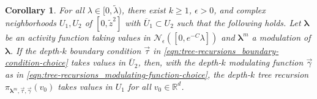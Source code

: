 \documentclass[11pt]{article}
\newcommand{\R}{\mathbb R}
\newcommand{\bl}{\bm{\lambda}}
\newcommand{\tl}{\tilde{\lambda}}
\newcommand{\tz}{\tilde{z}}
\newcommand{\lsconst}{C}
\numberwithin{equation}{section}
\theoremstyle{plain}
\newtheorem{corollary}[theorem]{Corollary}
\theoremstyle{definition}
\theoremstyle{remark}
\begin{document}
\begin{corollary}
\label{cor:contraction-properties_complex-contraction_final-result}
For all $\lambda\in[0,\tl)$, there exist $k\ge 1$, $\epsilon>0$, and complex neighborhoods $U_{1},U_{2}$ of $[0,\tz^{2}]$ with $\overline{U}_{1}\subset U_{2}$ such that the following holds.
Let $\bl$ be an activity function taking values in $\mathcal{N}_{\epsilon}([0,e^{-\lsconst}\lambda])$ and $\bl^{m}$ a modulation of $\bl$.
If the depth-$k$ boundary condition $\vec{\tau}$ in \eqref{eqn:tree-recursions_boundary-condition-choice} takes values in $\overline{U}_{2}$, then, with the depth-$k$ modulating function $\vec{\gamma}$ as in \eqref{eqn:tree-recursions_modulating-function-choice}, the depth-$k$ tree recursion $\pi_{\bl^{m},\vec{\tau},\vec{\gamma}}(v_{0})$ takes values in $U_{1}$ for all $v_{0}\in\R^{d}$.
\end{corollary}
\end{document}
